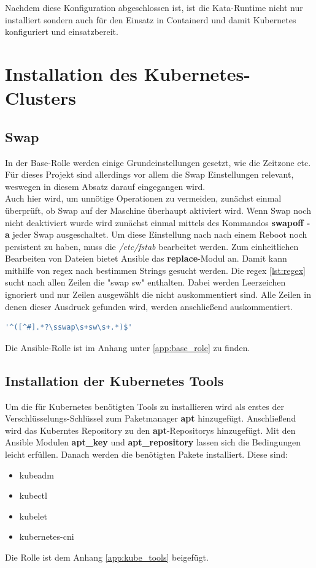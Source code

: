 Nachdem diese Konfiguration abgeschlossen ist, ist die Kata-Runtime nicht nur installiert sondern auch für den Einsatz in Containerd und damit Kubernetes konfiguriert und einsatzbereit.


\section{Installation des Kubernetes-Clusters}

\subsection{Swap}
In der Base-Rolle werden einige Grundeinstellungen gesetzt, wie die Zeitzone etc.
Für dieses Projekt sind allerdings vor allem die Swap Einstellungen relevant, weswegen in diesem Absatz darauf eingegangen wird.
\\
Auch hier wird, um unnötige Operationen zu vermeiden, zunächst einmal überprüft, ob Swap auf der Maschine überhaupt aktiviert wird.
Wenn Swap noch nicht deaktiviert wurde wird zunächst einmal mittels des Kommandos \textbf{swapoff -a} jeder Swap ausgeschaltet.
Um diese Einstellung nach nach einem Reboot noch persistent zu haben, muss die \textit{/etc/fstab} bearbeitet werden.
Zum einheitlichen Bearbeiten von Dateien bietet Ansible das \textbf{replace}-Modul an.
Damit kann mithilfe von \ac{regex} nach bestimmen Strings gesucht werden.
Die \ac{regex} \ref{lst:regex} sucht nach allen Zeilen die "swap sw" enthalten. 
Dabei werden Leerzeichen ignoriert und nur Zeilen ausgewählt die nicht auskommentiert sind. \cite{regex}
Alle Zeilen in denen dieser Ausdruck gefunden wird, werden anschließend auskommentiert.
\begin{lstlisting}[language=bash, caption=regex, label=lst:regex]
'^([^#].*?\sswap\s+sw\s+.*)$'
\end{lstlisting}
Die Ansible-Rolle ist im Anhang unter \ref{app:base_role} zu finden.


\subsection{Installation der Kubernetes Tools}
Um die für Kubernetes benötigten Tools zu installieren wird als erstes der Verschlüsselungs-Schlüssel zum Paketmanager \textbf{apt} hinzugefügt.
Anschließend wird das Kuberntes Repository zu den \textbf{apt}-Repositorys hinzugefügt. 
Mit den Ansible Modulen \textbf{apt\_key} und \textbf{apt\_repository} lassen sich die Bedingungen leicht erfüllen.
Danach werden die benötigten Pakete installiert. 
Diese sind:
\begin{itemize}
    \item kubeadm
    \item kubectl
    \item kubelet
    \item kubernetes-cni
\end{itemize}
Die Rolle ist dem Anhang \ref{app:kube_tools} beigefügt.


